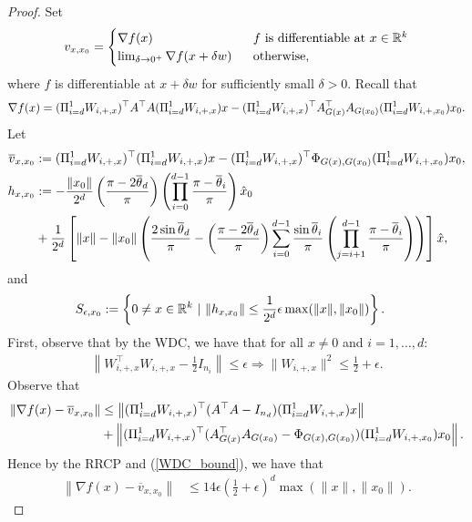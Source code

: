 \documentclass{article}
\begin{document}
\begin{proof}
Set \begin{align*}
v_{x,x_0} = \begin{cases}
\nabla f(x)\ &\ f\ \text{is differentiable at}\ x \in \R^k\\
\lim_{\delta \rightarrow 0^+} \nabla f(x + \delta w)\ &\ \text{otherwise,}
\end{cases}
\end{align*} where $f$ is differentiable at $x + \delta w$ for sufficiently small $\delta > 0$. Recall that \begin{align*}
\nabla f(x) = (\Pi_{i=d}^1 W_{i,+,x})^\top A^\top A (\Pi_{i=d}^1 W_{i,+,x})x - (\Pi_{i=d}^1 W_{i,+,x})^\top A_{G(x)}^\top A_{G(x_0)}(\Pi_{i=d}^1 W_{i,+,x_0})x_0.
\end{align*} Let \begin{align}
\overline{v}_{x,x_0} & := (\Pi_{i=d}^1 W_{i,+,x})^\top(\Pi_{i=d}^1 W_{i,+,x})x - (\Pi_{i=d}^1 W_{i,+,x})^\top \Phi_{G(x),G(x_0)} (\Pi_{i=d}^1 W_{i,+,x_0})x_0, \label{vbar_def} \\
h_{x,x_0} & : = - \frac{\|x_0\|}{2^d}\left(\frac{\pi - 2\overline{\theta}_d}{\pi}\right)\left(\prod_{i=0}^{d-1}\frac{\pi - \overline{\theta}_i}{\pi}\right)\hat{x}_0 \\
& + \frac{1}{2^d}\left[\|x\| - \|x_0\|\left( \frac{2\sin \overline{\theta}_d}{\pi} - \left(\frac{\pi - 2\overline{\theta}_d}{\pi}\right) \sum_{i=0}^{d-1} \frac{\sin \overline{\theta}_i}{\pi}\left(\prod_{j=i+1}^{d-1} \frac{\pi - \overline{\theta}_i}{\pi}\right)\right)\right]\hat{x}, \label{h_xdef}
\end{align} and \begin{align*}
S_{\epsilon,x_0} & : = \left\{0 \neq x \in \mathbb{R}^k\ |\ \|h_{x,x_0}\| \leq \frac{1}{2^d}\epsilon \max(\|x\|,\|x_0\|)\right\}.
\end{align*} First, observe that by the WDC, we have that for all $x \neq 0$ and $i = 1,\dots,d$: \begin{align}
\left\|W_{i,+,x}^\top W_{i,+,x} - \frac{1}{2}I_{n_i}\right\| \leq \epsilon \Longrightarrow \|W_{i,+,x}\|^2 \leq \frac{1}{2} + \epsilon. \label{WDC_bound}
\end{align} Observe that \begin{align*}
\left\|\nabla f(x) - \overline{v}_{x,x_0}\right\| & \leq \left\|(\Pi_{i=d}^1 W_{i,+,x})^\top(A^\top A - I_{n_d})(\Pi_{i=d}^1 W_{i,+,x})x\right\| \\
& + \left\|(\Pi_{i=d}^1 W_{i,+,x})^\top(A_{G(x)}^\top A_{G(x_0)} - \Phi_{G(x),G(x_0)})(\Pi_{i=d}^1 W_{i,+,x_0})x_0\right\|.
\end{align*} Hence by the RRCP and (\ref{WDC_bound}), we have that \begin{align}
\left\|\nabla f(x) - \overline{v}_{x,x_0}\right\| & \leq 14 \epsilon\left(\frac{1}{2} + \epsilon\right)^d \max(\|x\|,\|x_0\|) \label{RRCP_bound}.\end{align} 


\end{proof}
\end{document}
